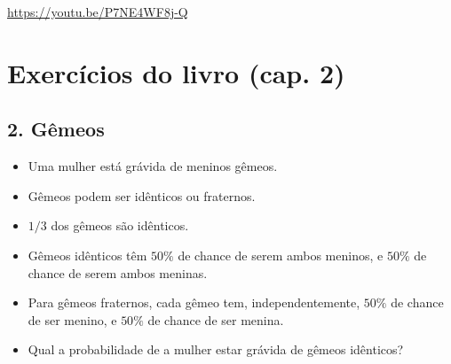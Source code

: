 \documentclass[
  11pt]{report}
\begin{document}
\begin{center} \url{https://youtu.be/P7NE4WF8j-Q} \end{center}

\hypertarget{exercuxedcios-do-livro-cap.-2}{%
\section*{Exercícios do livro (cap. 2)}\label{exercuxedcios-do-livro-cap.-2}}

\hypertarget{guxeameos}{%
\subsection*{2. Gêmeos}\label{guxeameos}}

\begin{rmdbox}

\begin{itemize}
\item
  Uma mulher está grávida de meninos gêmeos.
\item
  Gêmeos podem ser idênticos ou fraternos.
\item
  $1/3$ dos gêmeos são idênticos.
\item
  Gêmeos idênticos têm $50\%$ de chance de serem ambos meninos, e $50\%$ de chance de serem ambos meninas.
\item
  Para gêmeos fraternos, cada gêmeo tem, independentemente, $50\%$ de chance de ser menino, e $50\%$ de chance de ser menina.
\item
  Qual a probabilidade de a mulher estar grávida de gêmeos idênticos?
\end{itemize}

\end{rmdbox}
\end{document}
